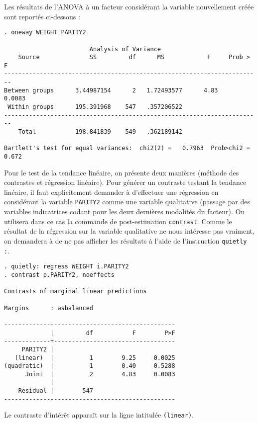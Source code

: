 Les résultats de l'ANOVA à un facteur considérant la variable nouvellement
créée sont reportés ci-dessous :
\begin{verbatim}
. oneway WEIGHT PARITY2

                        Analysis of Variance
    Source              SS         df      MS            F     Prob > F
------------------------------------------------------------------------
Between groups      3.44987154      2   1.72493577      4.83     0.0083
 Within groups      195.391968    547   .357206522
------------------------------------------------------------------------
    Total           198.841839    549   .362189142

Bartlett's test for equal variances:  chi2(2) =   0.7963  Prob>chi2 = 0.672
\end{verbatim}
Pour le test de la tendance linéaire, on présente deux manières (méthode des
contrastes et régression linéaire). Pour générer un contraste testant la
tendance linéaire, il faut explicitement demander à \Stata d'effectuer une
régression en considérant la variable \texttt{PARITY2} comme une variable
qualitative (passage par des variables indicatrices codant pour les deux
dernières modalités du facteur). On utilisera dans ce cas la commande de
post-estimation \texttt{contrast}. Comme le résultat de la régression sur la
variable qualitative ne nous intéresse pas vraiment, on demandera à \Stata de
ne pas afficher les résultats à l'aide de l'instruction \verb|quietly :|.
\begin{verbatim}
. quietly: regress WEIGHT i.PARITY2
. contrast p.PARITY2, noeffects

Contrasts of marginal linear predictions

Margins      : asbalanced

------------------------------------------------
             |         df           F        P>F
-------------+----------------------------------
     PARITY2 |
   (linear)  |          1        9.25     0.0025
(quadratic)  |          1        0.40     0.5288
      Joint  |          2        4.83     0.0083
             |
    Residual |        547
------------------------------------------------
\end{verbatim}
Le contraste d'intérêt apparaît sur la ligne intitulée \verb|(linear)|.

